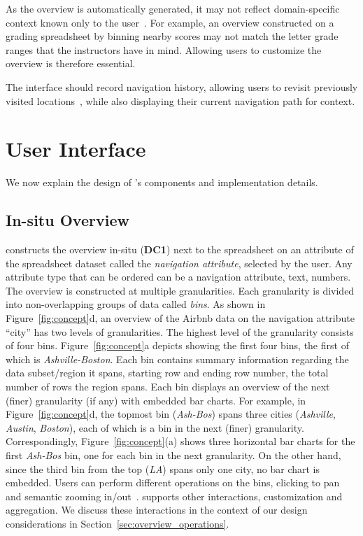 As the overview is automatically generated,
it may not reflect domain-specific context
known only to the user~\cite{Raman99scalablespreadsheets}.
For example, an overview constructed on a grading
spreadsheet by binning nearby scores
may not match the letter grade ranges
that the instructors have in mind.
Allowing users to customize the overview is therefore essential.

The interface should record navigation history,
allowing users to revisit previously visited locations~\cite{shneiderman2003eyes},
while also displaying their current navigation path for context.

\section{User Interface}
\label{sec:ui}
We now explain the design of \noah's components
and implementation details.

\subsection{In-situ Overview}

\noah constructs the overview in-situ ({\bf DC1})
next to the spreadsheet
on an attribute of the spreadsheet dataset
called the {\em navigation attribute},
selected by the user.
Any attribute type that can be ordered
can be a navigation attribute, \eg
text, numbers.
The overview is constructed at multiple granularities.
Each granularity is divided into non-overlapping
groups of data called {\em bins}.
As shown in Figure~\ref{fig:concept}d,
an overview of the Airbnb data
on the navigation attribute ``city''
has two levels of granularities.
The highest level of the granularity
consists of four bins.
Figure~\ref{fig:concept}a
depicts \noah showing the first four bins,
the first of which is {\em Ashville-Boston}.
Each bin contains summary information
regarding the data subset/region
it spans, \eg starting row and
ending row number,
the total number of rows the region spans.
Each bin displays an overview
of the next (finer) granularity (if any)
with embedded bar charts.
For example, in Figure~\ref{fig:concept}d,
the topmost bin ({\em Ash-Bos}) spans three cities
({\em Ashville}, {\em Austin}, {\em Boston}), each of which is a bin
in the next (finer) granularity.
Correspondingly, Figure~\ref{fig:concept}(a)
shows three horizontal bar charts for the
first {\em Ash-Bos} bin,
one for each bin in the next granularity.
On the other hand,
since the third bin from the top
(\emph{LA}) spans only one city,
no bar chart is embedded.
Users can perform different
operations on the bins, \eg clicking to pan and
semantic zooming in/out~\cite{perlin1993pad}.
\noah supports other interactions,
\eg customization and aggregation.
We discuss these interactions
in the context of our design considerations in Section~\ref{sec:overview_operations}.

